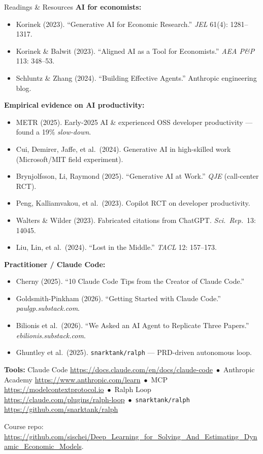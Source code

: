 \documentclass[aspectratio=169,10pt]{beamer}
\begin{document}
\begin{frame}{Readings \& Resources}
\tiny
\textbf{AI for economists:}
\begin{itemize}\itemsep0pt
    \item Korinek (2023). ``Generative AI for Economic Research.'' \emph{JEL} 61(4): 1281--1317.
    \item Korinek \& Balwit (2023). ``Aligned AI as a Tool for Economists.'' \emph{AEA P\&P} 113: 348--53.
    \item Schluntz \& Zhang (2024). ``Building Effective Agents.'' Anthropic engineering blog.
\end{itemize}

\textbf{Empirical evidence on AI productivity:}
\begin{itemize}\itemsep0pt
    \item METR (2025). Early-2025 AI \& experienced OSS developer productivity --- found a 19\% \emph{slow-down}.
    \item Cui, Demirer, Jaffe, et al.\ (2024). Generative AI in high-skilled work (Microsoft/MIT field experiment).
    \item Brynjolfsson, Li, Raymond (2025). ``Generative AI at Work.'' \emph{QJE} (call-center RCT).
    \item Peng, Kalliamvakou, et al.\ (2023). Copilot RCT on developer productivity.
    \item Walters \& Wilder (2023). Fabricated citations from ChatGPT. \emph{Sci.\ Rep.}\ 13: 14045.
    \item Liu, Lin, et al.\ (2024). ``Lost in the Middle.'' \emph{TACL} 12: 157--173.
\end{itemize}

\textbf{Practitioner / Claude Code:}
\begin{itemize}\itemsep0pt
    \item Cherny (2025). ``10 Claude Code Tips from the Creator of Claude Code.''
    \item Goldsmith-Pinkham (2026). ``Getting Started with Claude Code.'' \emph{paulgp.substack.com}.
    \item Bilionis et al.\ (2026). ``We Asked an AI Agent to Replicate Three Papers.'' \emph{ebilionis.substack.com}.
    \item Ghuntley et al.\ (2025). \texttt{snarktank/ralph} --- PRD-driven autonomous loop.
\end{itemize}

\textbf{Tools:}
Claude Code \url{https://docs.claude.com/en/docs/claude-code} \,$\bullet$\,
Anthropic Academy \url{https://www.anthropic.com/learn} \,$\bullet$\,
MCP \url{https://modelcontextprotocol.io} \,$\bullet$\,
Ralph Loop \url{https://claude.com/plugins/ralph-loop} \,$\bullet$\,
\texttt{snarktank/ralph} \url{https://github.com/snarktank/ralph}

\vspace{0.1em}
Course repo: \url{https://github.com/sischei/Deep_Learning_for_Solving_And_Estimating_Dynamic_Economic_Models}.
\end{frame}
\end{document}
